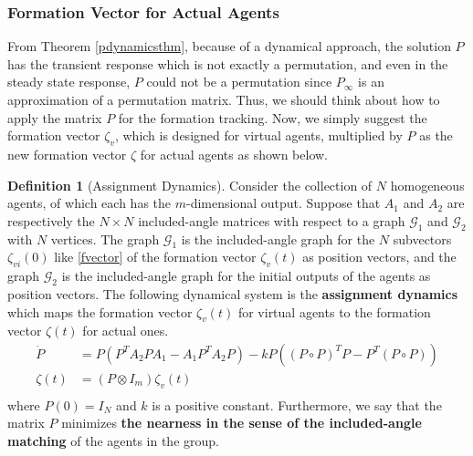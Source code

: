 \documentclass[11pt, a4paper, oneside, openany, reqno]{book}
\theoremstyle{definition}
\newtheorem{definition}[theorem]{Definition}
\theoremstyle{remark}
\numberwithin{equation}{chapter} %
\newcommand{\GRP}{\mathcal{G}}
\begin{document}
\subsubsection{Formation Vector for Actual Agents}

From Theorem \ref{pdynamicsthm}, because of a dynamical approach, the solution $ P $ 
has the transient response which is not exactly a permutation, 
and even in the steady state response, $ P $ could not be a permutation
since $ P_\infty $ is an approximation of a permutation matrix.
Thus, we should think about how to apply the matrix $ P $ for the formation tracking.
Now, we simply suggest the formation vector $ \zeta_v $, which is designed for virtual agents,
multiplied by $ P $ as the new formation vector $ \zeta $ for actual agents as shown below.

\begin{definition}[Assignment Dynamics]\label{asigndyndef}
	Consider the collection of $ N $ homogeneous agents, 
	of which each has the $ m $-dimensional output.
	Suppose that $ A_1 $ and $ A_2 $ are respectively the $ N \times N $ included-angle matrices
	with respect to a graph $ \GRP_1 $ and $ \GRP_2 $ with $ N $ vertices.
	The graph $ \GRP_1 $ is the included-angle graph 
	for the $ N $ subvectors $ \zeta_{vi}(0) $ like \eqref{fvector} 
	of the formation vector $ \zeta_v(t) $ as position vectors, and
	the graph $ \GRP_2 $ is the included-angle graph 
	for the initial outputs of the agents as position vectors.
	The following dynamical system is the \textbf{assignment dynamics} 
	which maps the formation vector $ \zeta_v(t) $ for virtual agents 
	to the formation vector $ \zeta(t) $ for actual ones.
	\begin{equation}\begin{split}\label{assigndynamics}
		\dot{P} &= P \left( P^T A_2 P A_1 - A_1 P^T A_2 P \right)
					-k P \left( (P \circ P)^T P -P^T (P \circ P) \right) \\
		\zeta(t) &= \left( P \otimes I_m \right) \zeta_v(t) \\
	\end{split}\end{equation}
	where $ P(0) = I_N $ and $ k $ is a positive constant.
	Furthermore, we say that the matrix $ P $ minimizes  
	\textbf{the nearness in the sense of the included-angle matching} 
	of the agents in the group.	
\end{definition}
\end{document}

